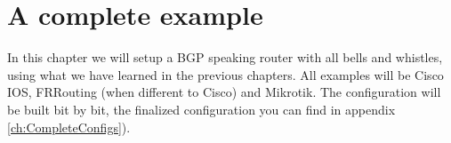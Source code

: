 \chapter{A complete example}
In this chapter we will setup a BGP speaking router with all bells and whistles, using what we have learned in the previous chapters. All examples will be Cisco IOS, FRRouting (when different to Cisco) and Mikrotik. The configuration will be built bit by bit, the finalized configuration you can find in appendix \ref{ch:CompleteConfigs}).
